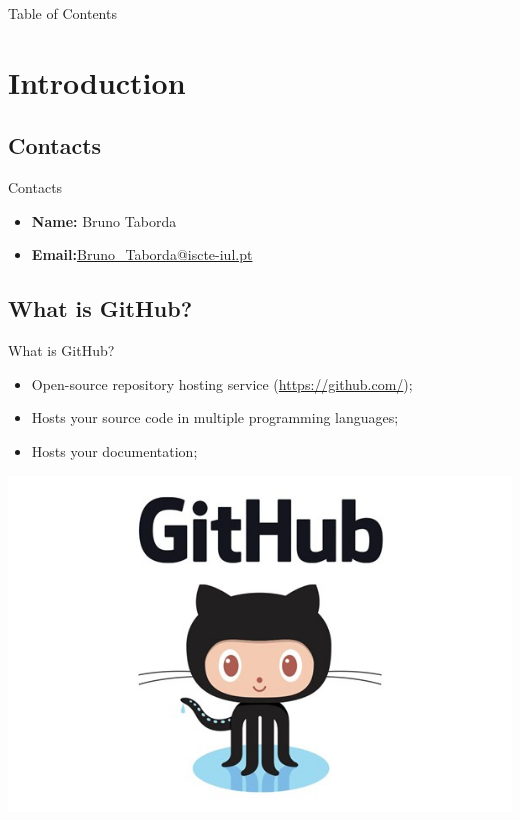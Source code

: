 \begin{noheadline}

\begin{frame}[allowframebreaks]{Table of Contents}

\tableofcontents

\end{frame}

\end{noheadline}


\section{Introduction}
\subsection{Contacts}
\begin{frame}{Contacts}
    \begin{itemize}
        \item \textbf{Name:} Bruno Taborda
        \item  \textbf{Email:}\href{mailto:Bruno\_Taborda@iscte-iul.pt}{Bruno\_Taborda@iscte-iul.pt}
    \end{itemize}
\end{frame}

\subsection{What is GitHub?}
\begin{frame}{What is GitHub?}
    \begin{itemize}
        \item Open-source repository hosting service (\href{https://github.com/}{https://github.com/});
        \item Hosts your source code in multiple programming languages;
        \item Hosts your documentation;        
    \end{itemize}
    \centering
    \includegraphics[scale=.3]{github}
\end{frame}

